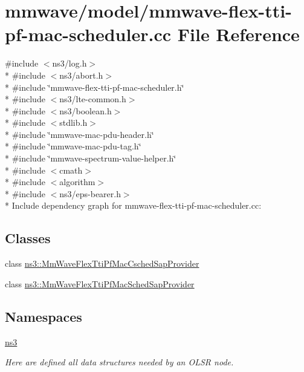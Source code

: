 \hypertarget{mmwave-flex-tti-pf-mac-scheduler_8cc}{}\section{mmwave/model/mmwave-\/flex-\/tti-\/pf-\/mac-\/scheduler.cc File Reference}
\label{mmwave-flex-tti-pf-mac-scheduler_8cc}
{\ttfamily \#include $<$ns3/log.\+h$>$}\\*
{\ttfamily \#include $<$ns3/abort.\+h$>$}\\*
{\ttfamily \#include \char`\"{}mmwave-\/flex-\/tti-\/pf-\/mac-\/scheduler.\+h\char`\"{}}\\*
{\ttfamily \#include $<$ns3/lte-\/common.\+h$>$}\\*
{\ttfamily \#include $<$ns3/boolean.\+h$>$}\\*
{\ttfamily \#include $<$stdlib.\+h$>$}\\*
{\ttfamily \#include \char`\"{}mmwave-\/mac-\/pdu-\/header.\+h\char`\"{}}\\*
{\ttfamily \#include \char`\"{}mmwave-\/mac-\/pdu-\/tag.\+h\char`\"{}}\\*
{\ttfamily \#include \char`\"{}mmwave-\/spectrum-\/value-\/helper.\+h\char`\"{}}\\*
{\ttfamily \#include $<$cmath$>$}\\*
{\ttfamily \#include $<$algorithm$>$}\\*
{\ttfamily \#include $<$ns3/eps-\/bearer.\+h$>$}\\*
Include dependency graph for mmwave-\/flex-\/tti-\/pf-\/mac-\/scheduler.cc\+:
\subsection*{Classes}
\begin{DoxyCompactItemize}
\item 
class \hyperlink{classns3_1_1MmWaveFlexTtiPfMacCschedSapProvider}{ns3\+::\+Mm\+Wave\+Flex\+Tti\+Pf\+Mac\+Csched\+Sap\+Provider}
\item 
class \hyperlink{classns3_1_1MmWaveFlexTtiPfMacSchedSapProvider}{ns3\+::\+Mm\+Wave\+Flex\+Tti\+Pf\+Mac\+Sched\+Sap\+Provider}
\end{DoxyCompactItemize}
\subsection*{Namespaces}
\begin{DoxyCompactItemize}
\item 
 \hyperlink{namespacens3}{ns3}
\begin{DoxyCompactList}\small\item\em Here are defined all data structures needed by an O\+L\+SR node. \end{DoxyCompactList}\end{DoxyCompactItemize}
